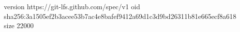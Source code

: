version https://git-lfs.github.com/spec/v1
oid sha256:3a1505ef2b3acee53b7ac4e8bafef9412a69d1c3d9bd26311b81e665ecf8a618
size 22000
